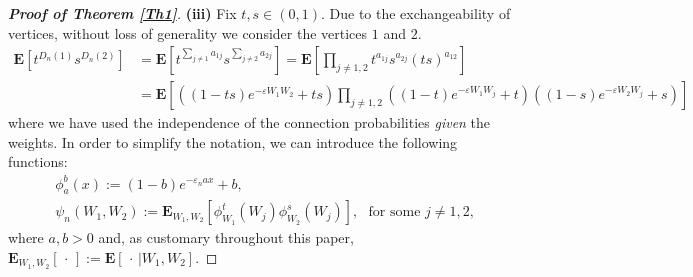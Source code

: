\documentclass[11pt, reqno]{amsart}
\numberwithin{equation}{section}
\theoremstyle{plain} %
\theoremstyle{definition} %
\newcommand{\eps}{\varepsilon}
\newcommand{\E}{\mathbf{E}}
\begin{document}
\begin{proof}[{\bf Proof of Theorem \ref{Th1}}]
%
{\bf (iii)}
Fix $t,s\in(0,1)$. Due to the exchangeability of vertices, without loss of generality we consider the vertices $1$ and $2$. 
\begin{equation}\label{eq:joint1}
     \begin{split}
         \E\left[ t^{D_{n}(1)} s^{D_n(2)} \right] &= \E \left[ t^{\sum_{j \neq 1} a_{1j}} s^{\sum_{j \neq 2} a_{2j}} \right] =\E\left[ \prod_{j \neq 1,2} t^{a_{1j}} s^{ a_{2j}} \left(t  s \right)^{a_{12}}\right] \\
         &=  \E\left[ \left( \left(1- t s \right) e^{-\eps W_1 W_2} + t s \right) \prod_{j \neq 1,2}     \left( \left(1- t \right) e^{-\eps W_1 W_j} + t \right) \left( \left(1- s \right) e^{-\eps W_2 W_j} + s \right)  \right] 
     \end{split}
\end{equation}
where we have used the independence of the connection probabilities \textit{given} the weights.
In order to simplify the notation, we can introduce the following functions:
\begin{equation}
\begin{split}
    &\phi_{a}^{b}(x) := \left(1 - b \right) e^{-\eps_n a x} + b,\\
    &\psi_n(W_1,W_2) := \E_{W_1,W_2} \left[  \phi_{W_1}^{t}(W_j) \phi_{W_2}^{s}(W_j)  \right],\,\, \text{ for some $j \neq 1, 2$},
\end{split}
\end{equation}
where $a, b>0$ and, as customary throughout this paper, $\E_{W_1, W_2}[\, \cdot\, ] := \E [\, \cdot \, | W_1,  W_2 ] $.


\end{proof}
\end{document}
